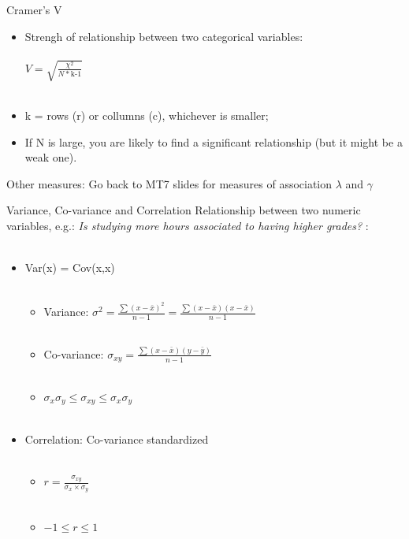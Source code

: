 \documentclass[10pt]{beamer}   %
\begin{document}

\begin{frame}{Cramer's V}
\begin{itemize}
\item Strengh of relationship between two categorical variables:  \\~\\
 $V= \sqrt{\frac{\chi^{2}}{N * \text{k-1}}}$   \\~\\
\item k = rows (r) or collumns (c), whichever is smaller;
\item If N is large, you are likely to find a significant
relationship (but it might be a weak one). 
\end{itemize}

\begin{block}{Other measures:}
Go back to MT7 slides for measures of association $\lambda$ and $\gamma$
\end{block}

\end{frame}



\begin{frame}{Variance, Co-variance and Correlation}
Relationship between two numeric variables, e.g.: \textit{Is studying more hours associated to having higher grades?} : \\~\\
\begin{itemize}
    \item Var(x) = Cov(x,x) \\~\\ 
\begin{itemize}
    \item Variance: $\sigma^{2} =\frac{\sum(x-\bar{x})^{2}}{n-1} = \frac{\sum(x-\bar{x})(x-\bar{x})}{n-1}$   \\~\\ 
    \item Co-variance: $\sigma_{xy} = \frac{\sum(x-\bar{x})(y-\bar{y})}{n-1} $  \\~\\ 
    \item $\sigma_{x}\sigma_{y} \leq \sigma_{xy} \leq \sigma_{x}\sigma_{y}$   \\~\\ 
\end{itemize}
    \item Correlation: Co-variance standardized \\~\\ 
\begin{itemize}
    \item $r=\frac{\sigma_{xy}}{\sigma_{x} \times \sigma_{y}}$  \\~\\ 
    \item $-1 \leq r \leq 1$
\end{itemize}
\end{itemize}

\end{frame}
\end{document}
